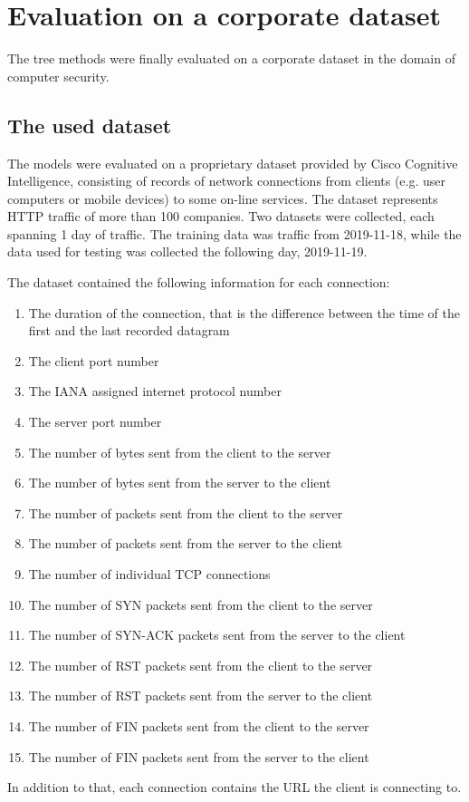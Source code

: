 \chapter{Evaluation on a corporate dataset}\label{chap:cisco-dataset}

The tree methods were finally evaluated on a corporate dataset in the domain of computer security.

\section{The used dataset}

The models were evaluated on a proprietary dataset provided by Cisco Cognitive Intelligence, consisting of records of network connections from clients (e.g. user computers or mobile devices) to some on-line services. The dataset represents HTTP traffic of more than 100 companies. Two datasets were collected, each spanning 1 day of traffic. The training data was traffic from 2019-11-18, while the data used for testing was collected the following day, 2019-11-19.

The dataset contained the following information for each connection:
\begin{enumerate}
  \item The duration of the connection, that is the difference between the time of the first and the last recorded datagram
  \item The client port number
  \item The IANA assigned internet protocol number
  \item The server port number
  \item The number of bytes sent from the client to the server
  \item The number of bytes sent from the server to the client
  \item The number of packets sent from the client to the server
  \item The number of packets sent from the server to the client
  \item The number of individual TCP connections
  \item The number of SYN packets sent from the client to the server
  \item The number of SYN-ACK packets sent from the server to the client
  \item The number of RST packets sent from the client to the server
  \item The number of RST packets sent from the server to the client
  \item The number of FIN packets sent from the client to the server
  \item The number of FIN packets sent from the server to the client
\end{enumerate}

In addition to that, each connection contains the URL the client is connecting to. \cite{pevny_nested_2020}
